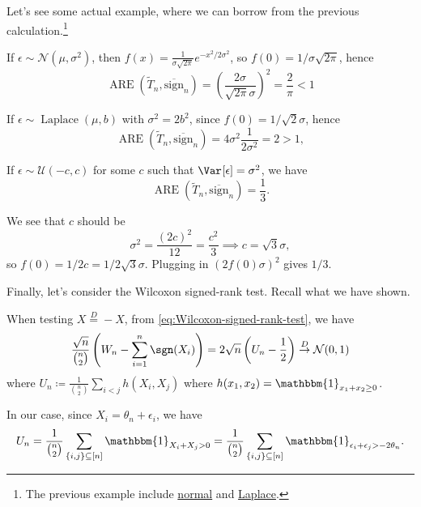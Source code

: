 Let's see some actual example, where we can borrow from the previous calculation.\footnote{The previous example include \hyperref[eg:ARE-normal]{normal} and \hyperref[eg:ARE-Laplace]{Laplace}.}

\begin{eg}[Gaussian]
	If \(\epsilon \sim \mathcal{N} (\mu , \sigma ^2)\), then \(f(x) = \frac{1}{\sigma \sqrt{2\pi } } e^{- x^2 / 2\sigma ^2}\), so \(f(0) = 1 / \sigma \sqrt{2\pi } \), hence
	\[
		\operatorname{ARE}(\widetilde{T} _n, \overline{\mathrm{sign}} _n)
		= \left( \frac{2\sigma }{\sqrt{2\pi } \sigma } \right) ^2
		= \frac{2}{\pi }
		< 1
	\]
\end{eg}

\begin{eg}[Laplace]
	If \(\epsilon \sim \operatorname{Laplace}(\mu , b) \) with \(\sigma ^2 = 2 b^2\), since \(f(0) = 1 /\sqrt{2} \sigma \), hence
	\[
		\operatorname{ARE}(\widetilde{T} _n, \overline{\mathrm{sign}} _n)
		= 4 \sigma ^2 \frac{1}{2 \sigma ^2}
		= 2
		> 1,
	\]
\end{eg}

\begin{eg}[Uniform]
	If \(\epsilon \sim \mathcal{U} (-c, c)\) for some \(c\) such that \(\Var_{}[\epsilon ] = \sigma ^2\), we have
	\[
		\operatorname{ARE}(\widetilde{T} _n, \overline{\mathrm{sign}} _n)
		= \frac{1}{3}.
	\]
\end{eg}
\begin{explanation}
	We see that \(c\) should be
	\[
		\sigma ^2
		= \frac{(2c)^2}{12}
		= \frac{c^2}{3}
		\implies c = \sqrt{3} \sigma ,
	\]
	so \(f(0) = 1 / 2c = 1 / 2 \sqrt{3} \sigma \). Plugging in \((2 f(0) \sigma )^2\) gives \(1 / 3\).
\end{explanation}

Finally, let's consider the Wilcoxon signed-rank test. Recall what we have shown.

\begin{prev}
	When testing \(X \overset{D}{=} -X\), from \autoref{eq:Wilcoxon-signed-rank-test}, we have
	\[
		\frac{\sqrt{n}}{\binom{n}{2}}  \left( W_n - \sum_{i=1}^{n} \sgn (X_i) \right)
		= 2 \sqrt{n} \left( U_n - \frac{1}{2} \right)
		\overset{D}{\to} \mathcal{N} (0, 1)
	\]
	where \(U_n \coloneqq \frac{1}{\binom{n}{2}} \sum_{i < j} h(X_i, X_j)\) where \(h(x_1, x_2) = \mathbbm{1}_{x_1 + x_2 \geq 0} \).
\end{prev}

In our case, since \(X_i = \theta _n + \epsilon _i\), we have
\[
	U_n
	= \frac{1}{\binom{n}{2}} \sum_{\{ i, j \} \subseteq [n]} \mathbbm{1}_{X_i + X_j > 0}
	= \frac{1}{\binom{n}{2}} \sum_{\{ i, j \} \subseteq [n]} \mathbbm{1}_{\epsilon _i + \epsilon _j > - 2 \theta _n}.
\]

